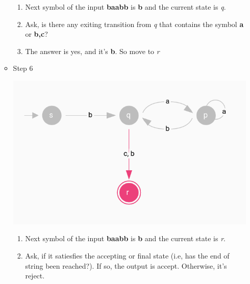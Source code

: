 \documentclass[12pt]{article}
\begin{document}
\begin{itemize}
\begin{itemize}
        \begin{enumerate}[1.]
            \item Next symbol of the input \textbf{baabb} is \textbf{b} and the current state is \textit{q}.
            \item Ask, is there any exiting transition from \textit{q} that contains the symbol \textbf{a} or \textbf{b,c}?
            \item The answer is yes, and it's \textbf{b}. So move to \textit{r}
        \end{enumerate}

        \item Step 6

        \begin{center}
        \includegraphics[width=\linewidth]{images/worksheet_8_notes_14.png}
        \end{center}

        \begin{enumerate}[1.]
            \item Next symbol of the input \textbf{baabb} is \textbf{b} and the current state is \textit{r}.
            \item Ask, if it satiesfies the accepting or final state (i.e, has the end of string been reached?). If so, the output is accept. Otherwise, it's reject.
        \end{enumerate}

    \end{itemize}
\end{itemize}
\end{document}
